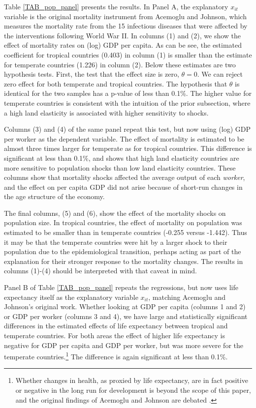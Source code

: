 \documentclass[12pt]{article}
\begin{document}
Table \ref{TAB_pop_panel} presents the results. In Panel A, the explanatory $x_{it}$ variable is the original mortality instrument from Acemoglu and Johnson, which measures the mortality rate from the 15 infectious diseases that were affected by the interventions following World War II. In columns (1) and (2), we show the effect of mortality rates on (log) GDP per capita. As can be see, the estimated coefficient for tropical countries (0.403) in column (1) is smaller than the estimate for temperate countries (1.226) in column (2). Below these estimates are two hypothesis tests. First, the test that the effect size is zero, $\theta=0$. We can reject zero effect for both temperate and tropical countries. The hypothesis that $\theta$ is identical for the two samples has a p-value of less than 0.1\%. The higher value for temperate countries is consistent with the intuition of the prior subsection, where a high land elasticity is associated with higher sensitivity to shocks.

Columns (3) and (4) of the same panel repeat this test, but now using (log) GDP per worker as the dependent variable. The effect of mortality is estimated to be almost three times larger for temperate as for tropical countries. This difference is significant at less than 0.1\%, and shows that high land elasticity countries are more sensitive to population shocks than low land elasticity countries. These columns show that mortality shocks affected the average output of each \textit{worker}, and the effect on per capita GDP did not arise because of short-run changes in the age structure of the economy.

The final columns, (5) and (6), show the effect of the mortality shocks on population size. In tropical countries, the effect of mortality on population was estimated to be smaller than in temperate countries (-0.255 versus -1.442). Thus it may be that the temperate countries were hit by a larger shock to their population due to the epidemiological transition, perhaps acting as part of the explanation for their stronger response to the mortality changes. The results in columns (1)-(4) should be interpreted with that caveat in mind.

Panel B of Table \ref{TAB_pop_panel} repeats the regressions, but now uses life expectancy itself as the explanatory variable $x_{it}$, matching Acemoglu and Johnson's original work. Whether looking at GDP per capita (columns 1 and 2) or GDP per worker (columns 3 and 4), we have large and statistically significant differences in the estimated effects of life expectancy between tropical and temperate countries. For both areas the effect of higher life expectancy is negative for GDP per capita and GDP per worker, but was  more severe for the temperate countries.\footnote{Whether changes in health, as proxied by life expectancy, are in fact positive or negative in the long run for development is beyond the scope of this paper, and the original findings of Acemoglu and Johnson are debated \citep{bcf2014}.} The difference is again significant at less than 0.1\%.
\end{document}

